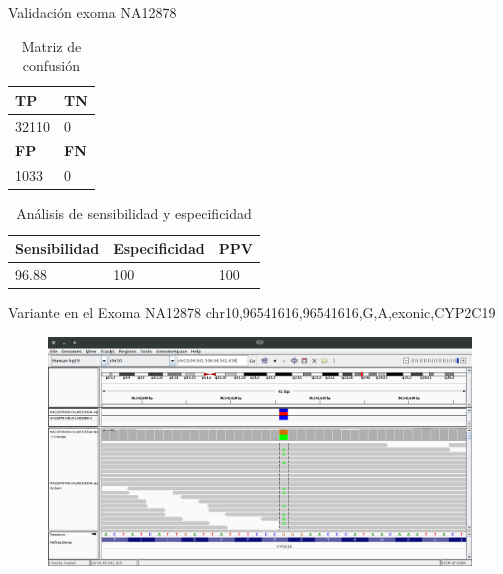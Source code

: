 \documentclass[xcolor=dvipsnames]{beamer}
\begin{document}
\begin{frame}{Validación exoma NA12878}
    \begin{table}[H]
	    \begin{center}
		    \begin{tabular}{|l|l|}
			    \hline 
			    \textbf{TP} &  \textbf{TN} \\
			    \hline 
			    32110 & 0  \\ \hline
			    \textbf{FP} &  \textbf{FN} \\
			    \hline
			    1033 &  0\\ \hline
		    \end{tabular}
		\caption{Matriz de confusión}
		\label{tabla:tabla3}
	\end{center}
\end{table}


\begin{table}[H]
	\begin{center}
		\begin{tabular}{|l|l|l|}
			\hline 
			\textbf{Sensibilidad} & \textbf{Especificidad} & \textbf{PPV} \\
			\hline 
			96.88 & 100 & 100 \\ \hline
		\end{tabular}
		\caption{Análisis de sensibilidad y especificidad}
		\label{tabla:tabla4}
	\end{center}
\end{table}

\end{frame}

\begin{frame}{Variante en el Exoma NA12878}
	chr10,96541616,96541616,G,A,exonic,CYP2C19
\begin{figure}[]
	\includegraphics[width=1.02\textwidth]{IGV}
\end{figure}

\end{frame}
\end{document}
